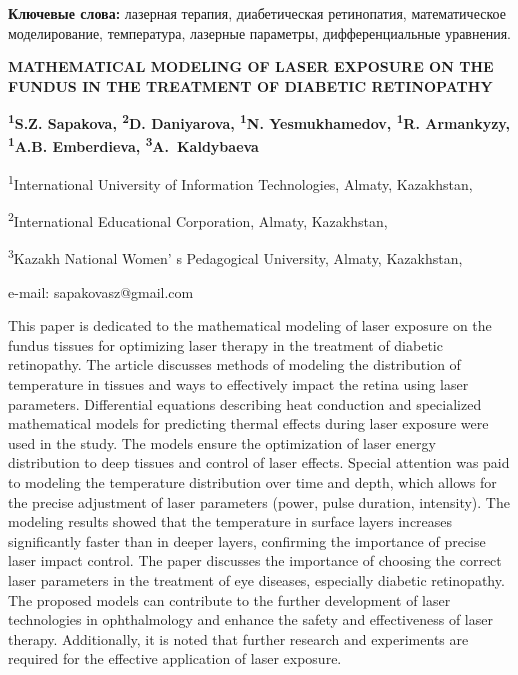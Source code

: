 {\bfseries Ключевые слова:} лазерная терапия, диабетическая ретинопатия,
математическое моделирование, температура, лазерные параметры,
дифференциальные уравнения.

\begin{articleheader}
{\bfseries MATHEMATICAL MODELING OF LASER EXPOSURE ON THE FUNDUS IN THE
TREATMENT OF DIABETIC RETINOPATHY}

{\bfseries
\textsuperscript{1}S.Z. Sapakova\textsuperscript{\envelope },
\textsuperscript{2}D. Daniyarova,
\textsuperscript{1}N. Yesmukhamedov,
\textsuperscript{1}R. Armankyzy,
\textsuperscript{1}A.B. Emberdieva,
\textsuperscript{3}A.~Kaldybaeva
}
\end{articleheader}

\begin{affiliation}
\textsuperscript{1}International University of Information Technologies, Almaty, Kazakhstan,

\textsuperscript{2}International Educational Corporation, Almaty, Kazakhstan,

\textsuperscript{3}Kazakh National Women' s Pedagogical University, Almaty, Kazakhstan,

e-mail: sapakovasz@gmail.com
\end{affiliation}

This paper is dedicated to the mathematical modeling of laser exposure
on the fundus tissues for optimiz\-ing laser therapy in the treatment of
diabetic retinopathy. The article discusses methods of modeling the
distribution of temperature in tissues and ways to effectively impact
the retina using laser parameters. Differential equations describing
heat conduction and specialized mathematical models for predicting
thermal effects during laser exposure were used in the study. The models
ensure the optimization of laser energy distribution to deep tissues and
control of laser effects. Special attention was paid to modeling the
temperature distribution over time and depth, which allows for the
precise adjustment of laser parameters (power, pulse duration,
intensity). The modeling results showed that the temperature in surface
layers increases significantly faster than in deeper layers, confirming
the importance of precise laser impact control. The paper discusses the
importance of choosing the correct laser parameters in the treatment of
eye diseases, especially diabetic retinopathy. The proposed models can
contribute to the further development of laser technologies in
ophthalmology and enhance the safety and effectiveness of laser therapy.
Additionally, it is noted that further research and experiments are
required for the effective application of laser exposure.

